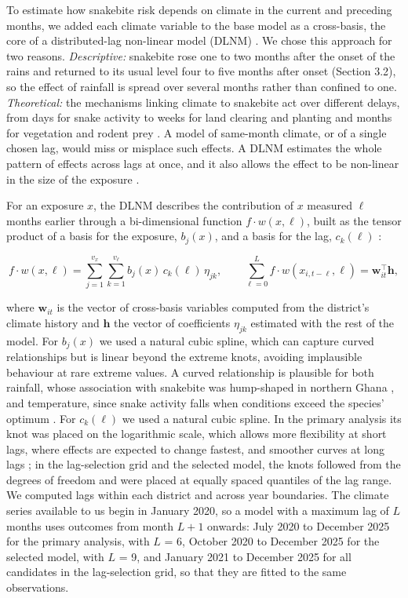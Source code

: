 \documentclass[11pt,a4paper]{article}
\begin{document}
To estimate how snakebite risk depends on climate in the current and preceding months, we added each climate variable to the base model as a cross-basis, the core of a distributed-lag non-linear model (DLNM) \cite{ref36}. We chose this approach for two reasons. \emph{Descriptive:} snakebite rose one to two months after the onset of the rains and returned to its usual level four to five months after onset (Section 3.2), so the effect of rainfall is spread over several months rather than confined to one. \emph{Theoretical:} the mechanisms linking climate to snakebite act over different delays, from days for snake activity to weeks for land clearing and planting \cite{ref5,ref6} and months for vegetation and rodent prey \cite{ref7}. A model of same-month climate, or of a single chosen lag, would miss or misplace such effects. A DLNM estimates the whole pattern of effects across lags at once, and it also allows the effect to be non-linear in the size of the exposure \cite{ref36}.

For an exposure \(x\), the DLNM describes the contribution of \(x\) measured \(\ell\) months earlier through a bi-dimensional function \(f\cdot w(x,\ell)\), built as the tensor product of a basis for the exposure, \(b_j(x)\), and a basis for the lag, \(c_k(\ell)\) \cite{ref36}:

\[f\cdot w(x,\ell) = \sum_{j=1}^{v_x}\sum_{k=1}^{v_\ell} b_j(x)\,c_k(\ell)\,\eta_{jk}, \qquad \sum_{\ell=0}^{L} f\cdot w(x_{i,t-\ell},\ell) = \mathbf{w}_{it}^{\top}\mathbf{h},\]

where \(\mathbf{w}_{it}\) is the vector of cross-basis variables computed from the district's climate history and \(\mathbf{h}\) the vector of coefficients \(\eta_{jk}\) estimated with the rest of the model. For \(b_j(x)\) we used a natural cubic spline, which can capture curved relationships but is linear beyond the extreme knots, avoiding implausible behaviour at rare extreme values. A curved relationship is plausible for both rainfall, whose association with snakebite was hump-shaped in northern Ghana \cite{ref6}, and temperature, since snake activity falls when conditions exceed the species' optimum \cite{ref8}. For \(c_k(\ell)\) we used a natural cubic spline. In the primary analysis its knot was placed on the logarithmic scale, which allows more flexibility at short lags, where effects are expected to change fastest, and smoother curves at long lags \cite{ref36}; in the lag-selection grid and the selected model, the knots followed from the degrees of freedom and were placed at equally spaced quantiles of the lag range. We computed lags within each district and across year boundaries. The climate series available to us begin in January 2020, so a model with a maximum lag of \(L\) months uses outcomes from month \(L+1\) onwards: July 2020 to December 2025 for the primary analysis, with \(L\) = 6, October 2020 to December 2025 for the selected model, with \(L\) = 9, and January 2021 to December 2025 for all candidates in the lag-selection grid, so that they are fitted to the same observations.
\end{document}
